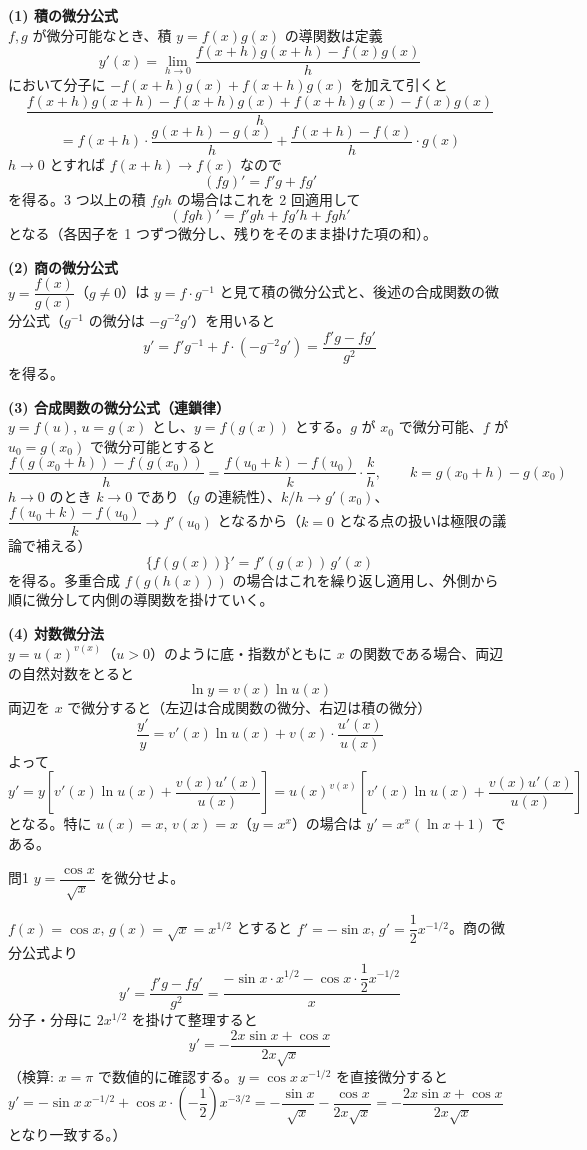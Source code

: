 \documentclass[a4paper,11pt]{article}
\begin{document}


\noindent
\textbf{(1) 積の微分公式}\\
$f, g$ が微分可能なとき、積 $y = f(x)g(x)$ の導関数は定義
\[
y'(x) = \lim_{h\to 0}\frac{f(x+h)g(x+h) - f(x)g(x)}{h}
\]
において分子に $-f(x+h)g(x) + f(x+h)g(x)$ を加えて引くと
\[
\frac{f(x+h)g(x+h) - f(x+h)g(x) + f(x+h)g(x) - f(x)g(x)}{h}
\]
\[
= f(x+h)\cdot\frac{g(x+h)-g(x)}{h} + \frac{f(x+h)-f(x)}{h}\cdot g(x)
\]
$h\to 0$ とすれば $f(x+h)\to f(x)$ なので
\[
(fg)' = f'g + fg'
\]
を得る。3 つ以上の積 $fgh$ の場合はこれを 2 回適用して
\[
(fgh)' = f'gh + fg'h + fgh'
\]
となる（各因子を 1 つずつ微分し、残りをそのまま掛けた項の和）。

\noindent
\textbf{(2) 商の微分公式}\\
$y = \dfrac{f(x)}{g(x)}$（$g\neq 0$）は $y = f\cdot g^{-1}$ と見て積の微分公式と、後述の合成関数の微分公式（$g^{-1}$ の微分は $-g^{-2}g'$）を用いると
\[
y' = f'g^{-1} + f\cdot(-g^{-2}g') = \frac{f'g - fg'}{g^{2}}
\]
を得る。

\noindent
\textbf{(3) 合成関数の微分公式（連鎖律）}\\
$y = f(u)$, $u = g(x)$ とし、$y = f(g(x))$ とする。$g$ が $x_0$ で微分可能、$f$ が $u_0 = g(x_0)$ で微分可能とすると
\[
\frac{f(g(x_0+h)) - f(g(x_0))}{h}
= \frac{f(u_0+k) - f(u_0)}{k}\cdot\frac{k}{h}, \qquad k = g(x_0+h) - g(x_0)
\]
$h\to 0$ のとき $k\to 0$ であり（$g$ の連続性）、$k/h \to g'(x_0)$、$\dfrac{f(u_0+k)-f(u_0)}{k}\to f'(u_0)$ となるから（$k=0$ となる点の扱いは極限の議論で補える）
\[
\{f(g(x))\}' = f'(g(x))\,g'(x)
\]
を得る。多重合成 $f(g(h(x)))$ の場合はこれを繰り返し適用し、外側から順に微分して内側の導関数を掛けていく。

\noindent
\textbf{(4) 対数微分法}\\
$y = u(x)^{v(x)}$（$u>0$）のように底・指数がともに $x$ の関数である場合、両辺の自然対数をとると
\[
\ln y = v(x)\ln u(x)
\]
両辺を $x$ で微分すると（左辺は合成関数の微分、右辺は積の微分）
\[
\frac{y'}{y} = v'(x)\ln u(x) + v(x)\cdot\frac{u'(x)}{u(x)}
\]
よって
\[
y' = y\left[v'(x)\ln u(x) + \frac{v(x)u'(x)}{u(x)}\right]
= u(x)^{v(x)}\left[v'(x)\ln u(x) + \frac{v(x)u'(x)}{u(x)}\right]
\]
となる。特に $u(x)=x$, $v(x)=x$（$y=x^{x}$）の場合は $y' = x^{x}(\ln x + 1)$ である。

\clearpage
\begin{mondaiboxS}{問1}
$y = \dfrac{\cos x}{\sqrt{x}}$ を微分せよ。
\end{mondaiboxS}
\kaitou
$f(x) = \cos x$, $g(x) = \sqrt{x} = x^{1/2}$ とすると $f' = -\sin x$, $g' = \dfrac{1}{2}x^{-1/2}$。商の微分公式より
\[
y' = \frac{f'g - fg'}{g^{2}}
= \frac{-\sin x\cdot x^{1/2} - \cos x\cdot \dfrac{1}{2}x^{-1/2}}{x}
\]
分子・分母に $2x^{1/2}$ を掛けて整理すると
\[
\boxed{\; y' = -\dfrac{2x\sin x + \cos x}{2x\sqrt{x}} \;}
\]
（検算: $x=\pi$ で数値的に確認する。$y=\cos x\,x^{-1/2}$ を直接微分すると
$y' = -\sin x\,x^{-1/2} + \cos x\cdot\left(-\dfrac{1}{2}\right)x^{-3/2}
= -\dfrac{\sin x}{\sqrt{x}} - \dfrac{\cos x}{2x\sqrt{x}}
= -\dfrac{2x\sin x + \cos x}{2x\sqrt{x}}$ となり一致する。）
\end{document}
